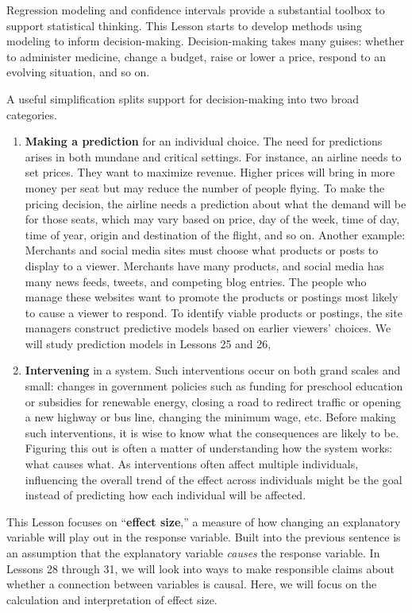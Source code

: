 \documentclass[
  letterpaper,
  DIV=11,
  numbers=noendperiod,
  oneside]{scrreprt}
\begin{document}
Regression modeling and confidence intervals provide a substantial
toolbox to support statistical thinking. This Lesson starts to develop
methods using modeling to inform decision-making. Decision-making takes
many guises: whether to administer medicine, change a budget, raise or
lower a price, respond to an evolving situation, and so on.

A useful simplification splits support for decision-making into two
broad categories.

\begin{enumerate}
\def\labelenumi{\arabic{enumi}.}
\item
  \textbf{Making a prediction} for an individual choice. The need for
  predictions arises in both mundane and critical settings. For
  instance, an airline needs to set prices. They want to maximize
  revenue. Higher prices will bring in more money per seat but may
  reduce the number of people flying. To make the pricing decision, the
  airline needs a prediction about what the demand will be for those
  seats, which may vary based on price, day of the week, time of day,
  time of year, origin and destination of the flight, and so on. Another
  example: Merchants and social media sites must choose what products or
  posts to display to a viewer. Merchants have many products, and social
  media has many news feeds, tweets, and competing blog entries. The
  people who manage these websites want to promote the products or
  postings most likely to cause a viewer to respond. To identify viable
  products or postings, the site managers construct predictive models
  based on earlier viewers' choices. We will study prediction models in
  Lessons 25 and 26,
\item
  \textbf{Intervening} in a system. Such interventions occur on both
  grand scales and small: changes in government policies such as funding
  for preschool education or subsidies for renewable energy, closing a
  road to redirect traffic or opening a new highway or bus line,
  changing the minimum wage, etc. Before making such interventions, it
  is wise to know what the consequences are likely to be. Figuring this
  out is often a matter of understanding how the system works: what
  causes what. As interventions often affect multiple individuals,
  influencing the overall trend of the effect across individuals might
  be the goal instead of predicting how each individual will be
  affected.
\end{enumerate}

This Lesson focuses on ``\textbf{effect size},'' a measure of how
changing an explanatory variable will play out in the response variable.
Built into the previous sentence is an assumption that the explanatory
variable \emph{causes} the response variable. In Lessons 28 through 31,
we will look into ways to make responsible claims about whether a
connection between variables is causal. Here, we will focus on the
calculation and interpretation of effect size.
\end{document}
